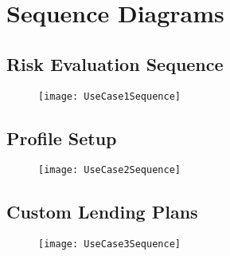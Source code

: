 \section{Sequence Diagrams}


\subsection{Risk Evaluation Sequence}

\begin{figure}[H]
\centering
\texttt{[image: UseCase1Sequence]}
\end{figure}



\subsection{Profile Setup}

\begin{figure}[H]
\centering
\texttt{[image: UseCase2Sequence]}
\end{figure}



\subsection{Custom Lending Plans}


\begin{figure}[H]
\centering
\texttt{[image: UseCase3Sequence]}
\end{figure}